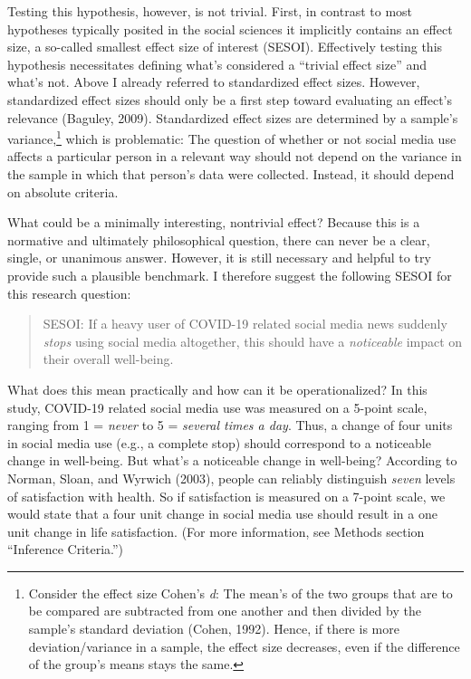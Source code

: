 \documentclass[
  english,
  man,floatsintext]{apa6}
\begin{document}
Testing this hypothesis, however, is not trivial.
First, in contrast to most hypotheses typically posited in the social sciences it implicitly contains an effect size, a so-called smallest effect size of interest (SESOI).
Effectively testing this hypothesis necessitates defining what's considered a ``trivial effect size'' and what's not.
Above I already referred to standardized effect sizes.
However, standardized effect sizes should only be a first step toward evaluating an effect's relevance (Baguley, 2009).
Standardized effect sizes are determined by a sample's variance,\footnote{Consider the effect size Cohen's \emph{d}: The mean's of the two groups that are to be compared are subtracted from one another and then divided by the sample's standard deviation (Cohen, 1992). Hence, if there is more deviation/variance in a sample, the effect size decreases, even if the difference of the group's means stays the same.} which is problematic:
The question of whether or not social media use affects a particular person in a relevant way should not depend on the variance in the sample in which that person's data were collected.
Instead, it should depend on absolute criteria.

What could be a minimally interesting, nontrivial effect?
Because this is a normative and ultimately philosophical question, there can never be a clear, single, or unanimous answer.
However, it is still necessary and helpful to try provide such a plausible benchmark.
I therefore suggest the following SESOI for this research question:

\begin{quote}
SESOI: If a heavy user of COVID-19 related social media news suddenly \emph{stops} using social media altogether, this should have a \emph{noticeable} impact on their overall well-being.
\end{quote}

What does this mean practically and how can it be operationalized?
In this study, COVID-19 related social media use was measured on a 5-point scale, ranging from 1 = \emph{never} to 5 = \emph{several times a day}.
Thus, a change of four units in social media use (e.g., a complete stop) should correspond to a noticeable change in well-being.
But what's a noticeable change in well-being?
According to Norman, Sloan, and Wyrwich (2003), people can reliably distinguish \emph{seven} levels of satisfaction with health.
So if satisfaction is measured on a 7-point scale, we would state that a four unit change in social media use should result in a one unit change in life satisfaction.
(For more information, see Methods section ``Inference Criteria.'')
\end{document}
